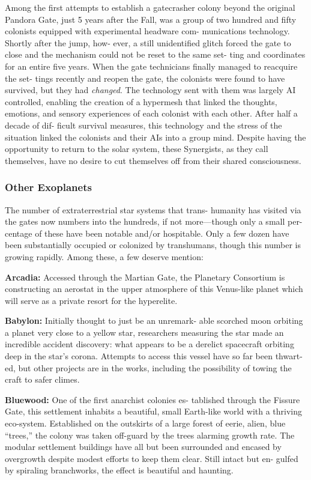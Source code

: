 Among the first attempts to establish a gatecrasher 
colony beyond the original Pandora Gate, just 5 years 
after the Fall, was a group of two hundred and fifty 
colonists equipped with experimental headware com-
munications technology. Shortly after the jump, how-
ever, a still unidentified glitch forced the gate to close 
and the mechanism could not be reset to the same set-
ting and coordinates for an entire five years. When the 
gate technicians finally managed to reacquire the set-
tings recently and reopen the gate, the colonists were 
found to have survived, but they had \textit{changed}. The 
technology sent with them was largely AI controlled, 
enabling the creation of a hypermesh that linked the 
thoughts, emotions, and sensory experiences of each 
colonist with each other. After half a decade of dif-
ficult survival measures, this technology and the stress 
of the situation linked the colonists and their AIs into 
a group mind. Despite having the opportunity to 
return to the solar system, these Synergists, as they 
call themselves, have no desire to cut themselves off 
from their shared consciousness.

\subsubsection{Other Exoplanets}

The number of extraterrestrial star systems that trans-
humanity has visited via the gates now numbers into 
the hundreds, if not more—though only a small per-
centage of these have been notable and/or hospitable. 
Only a few dozen have been substantially occupied 
or colonized by transhumans, though this number is 
growing rapidly. Among these, a few deserve mention:

\textbf{Arcadia:} Accessed through the Martian Gate, the 
Planetary Consortium is constructing an aerostat in 
the upper atmosphere of this Venus-like planet which 
will serve as a private resort for the hyperelite.

\textbf{Babylon:} Initially thought to just be an unremark-
able scorched moon orbiting a planet very close to a 
yellow star, researchers measuring the star made an 
incredible accident discovery: what appears to be a 
derelict spacecraft orbiting deep in the star's corona. 
Attempts to access this vessel have so far been thwart-
ed, but other projects are in the works, including the 
possibility of towing the craft to safer climes.

\textbf{Bluewood:} One of the first anarchist colonies es-
tablished through the Fissure Gate, this settlement 
inhabits a beautiful, small Earth-like world with a 
thriving eco-system. Established on the outskirts of 
a large forest of eerie, alien, blue ``trees,'' the colony 
was taken off-guard by the trees alarming growth 
rate. The modular settlement buildings have all but 
been surrounded and encased by overgrowth despite 
modest efforts to keep them clear. Still intact but en-
gulfed by spiraling branchworks, the effect is beautiful 
and haunting.

